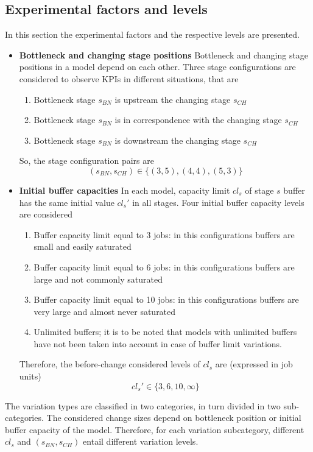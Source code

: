 \subsection{Experimental factors and levels}
In this section the experimental factors and the respective levels are presented. 
\begin{itemize}
\item \textbf{Bottleneck and changing stage positions} Bottleneck and changing stage positions in a model depend on each other. Three stage configurations are considered to observe KPIs in different situations, that are 
\begin{enumerate}
\item Bottleneck stage $s_{BN}$ is upstream the changing stage $s_{CH}$
\item Bottleneck stage $s_{BN}$ is in correspondence with the changing stage $s_{CH}$
\item Bottleneck stage $s_{BN}$ is downstream the changing stage $s_{CH}$
\end{enumerate}
So, the stage configuration pairs are
\[(s_{BN},s_{CH})\in\{(3,5),(4,4),(5,3)\}\]
\item \textbf{Initial buffer capacities} In each model, capacity limit $cl_s$ of stage $s$ buffer has the same initial value $cl_s'$ in all stages. Four initial buffer capacity levels are considered 
\begin{enumerate}
\item Buffer capacity limit equal to 3 jobs: in this configurations buffers are small and easily saturated
\item Buffer capacity limit equal to 6 jobs: in this configurations buffers are large and not commonly saturated
\item Buffer capacity limit equal to 10 jobs: in this configurations buffers are very large and almost never saturated
\item Unlimited buffers; it is to be noted that models with unlimited buffers have not been taken into account in case of buffer limit variations.
\end{enumerate}
Therefore, the before-change considered levels of $cl_s$ are (expressed in job units)
\[cl_s'\in\{3,6,10,\infty\}\]
\end{itemize}
The variation types are classified in two categories, in turn divided in two sub-categories. The considered change sizes depend on bottleneck position or initial buffer capacity of the model. Therefore, for each variation subcategory, different $cl_s$ and $(s_{BN},s_{CH})$ entail different variation levels. 
